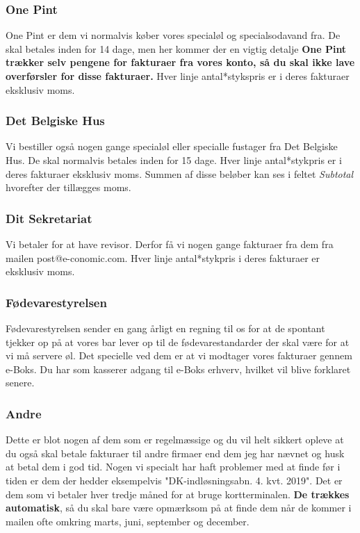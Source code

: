 \subsubsection{One Pint}
One Pint er dem vi normalvis køber vores specialøl og specialsodavand fra. De skal betales inden for 14 dage, men her kommer der en vigtig detalje \textbf{One Pint trækker selv pengene for fakturaer fra vores konto, så du skal ikke lave overførsler for disse fakturaer.} Hver linje antal*stykspris er i deres fakturaer eksklusiv moms.
\subsubsection{Det Belgiske Hus}
Vi bestiller også nogen gange specialøl eller specialle fustager fra Det Belgiske Hus. De skal normalvis betales inden for 15 dage. Hver linje antal*stykpris er i deres fakturaer eksklusiv moms. Summen af disse beløber kan ses i feltet \textit{Subtotal} hvorefter der tillægges moms.
\subsubsection{Dit Sekretariat}
Vi betaler for at have revisor. Derfor få vi nogen gange fakturaer fra dem fra mailen post@e-conomic.com. Hver linje antal*stykpris i deres fakturaer er eksklusiv moms.
\subsubsection{Fødevarestyrelsen}
Fødevarestyrelsen sender en gang årligt en regning til os for at de spontant tjekker op på at vores bar lever op til de fødevarestandarder der skal være for at vi må servere øl. Det specielle ved dem er at vi modtager vores fakturaer gennem e-Boks. Du har som kasserer adgang til e-Boks erhverv, hvilket vil blive forklaret senere.
\subsubsection{Andre}
Dette er blot nogen af dem som er regelmæssige og du vil helt sikkert opleve at du også skal betale fakturaer til andre firmaer end dem jeg har nævnet og husk at betal dem i god tid. Nogen vi specialt har haft problemer med at finde før i tiden er dem der hedder eksempelvis "DK-indløsningsabn. 4. kvt. 2019". Det er dem som vi betaler hver tredje måned for at bruge kortterminalen. \textbf{De trækkes automatisk}, så du skal bare være opmærksom på at finde dem når de kommer i mailen ofte omkring marts, juni, september og december.
